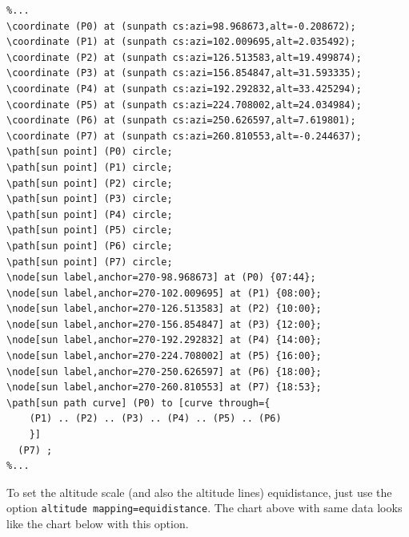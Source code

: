 \begin{verbatim}
%...
\coordinate (P0) at (sunpath cs:azi=98.968673,alt=-0.208672);
\coordinate (P1) at (sunpath cs:azi=102.009695,alt=2.035492);
\coordinate (P2) at (sunpath cs:azi=126.513583,alt=19.499874);
\coordinate (P3) at (sunpath cs:azi=156.854847,alt=31.593335);
\coordinate (P4) at (sunpath cs:azi=192.292832,alt=33.425294);
\coordinate (P5) at (sunpath cs:azi=224.708002,alt=24.034984);
\coordinate (P6) at (sunpath cs:azi=250.626597,alt=7.619801);
\coordinate (P7) at (sunpath cs:azi=260.810553,alt=-0.244637);
\path[sun point] (P0) circle;
\path[sun point] (P1) circle;
\path[sun point] (P2) circle;
\path[sun point] (P3) circle;
\path[sun point] (P4) circle;
\path[sun point] (P5) circle;
\path[sun point] (P6) circle;
\path[sun point] (P7) circle;
\node[sun label,anchor=270-98.968673] at (P0) {07:44};
\node[sun label,anchor=270-102.009695] at (P1) {08:00};
\node[sun label,anchor=270-126.513583] at (P2) {10:00};
\node[sun label,anchor=270-156.854847] at (P3) {12:00};
\node[sun label,anchor=270-192.292832] at (P4) {14:00};
\node[sun label,anchor=270-224.708002] at (P5) {16:00};
\node[sun label,anchor=270-250.626597] at (P6) {18:00};
\node[sun label,anchor=270-260.810553] at (P7) {18:53};
\path[sun path curve] (P0) to [curve through={ 
    (P1) .. (P2) .. (P3) .. (P4) .. (P5) .. (P6) 
    }] 
  (P7) ;
%...
\end{verbatim}

To set the altitude scale (and also the altitude lines) equidistance, just use the option \verb|altitude mapping=equidistance|.
The chart above with same data looks like the chart below with this option.

